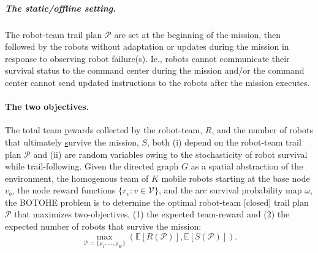 \documentclass[11pt, oneside]{article}
\begin{document}
\vspace{-\baselineskip}
\subparagraph{The static/offline setting.} 
The robot-team trail plan $\mathcal{P}$ are set at the beginning of the mission, then followed by the robots without adaptation or updates during the mission in response to observing robot failure(s).
Ie., robots cannot communicate their survival status to the command center during the mission and/or the command center cannot send updated instructions to the robots after the mission executes.

\paragraph{The two objectives.}
The total team \underline{r}ewards collected by the robot-team, $R$, and the number of robots that ultimately \underline{s}urvive the mission, $S$, both (i) depend on the robot-team trail plan $\mathcal{P}$ and (ii) are random variables owing to the stochasticity of robot survival while trail-following.
Given 
the directed graph $G$ as a spatial abstraction of the environment, 
the homogenous team of $K$ mobile robots starting at the base node $v_b$,
the node reward functions $\{r_v : v \in\mathcal{V}\}$, 
and the arc survival probability map $\omega$, 
the BOTOHE problem is to determine the optimal robot-team [closed] trail plan $\mathcal{P}$ that maximizes two-objectives, (1) the expected team-reward and (2) the expected number of robots that survive the mission:
\begin{equation}
\max_{\mathcal{P}=\{\rho_1, ..., \rho_K\}} \left( \mathbb{E}[R(\mathcal{P})], \mathbb{E}[S(\mathcal{P})] \right).
\label{eq:the_two_objs}
\end{equation}
\end{document}
